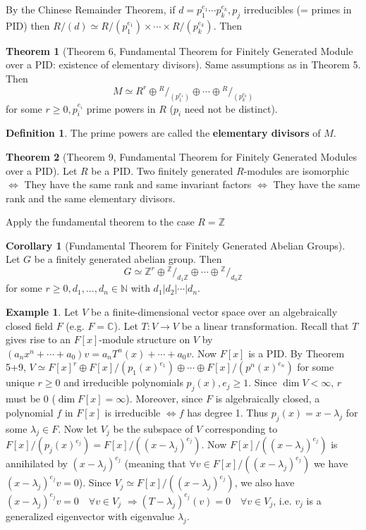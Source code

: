 \documentclass{article}
\theoremstyle{definition}
\newtheorem{thm}{Theorem}
\newtheorem{ex}{Example}
\newtheorem{dfn}{Definition}
\newtheorem{cor}{Corollary}
\newcommand*\quot[2]{{^{\textstyle #1}\big/_{\textstyle #2}}}
\newcommand{\CC}{\mathbb C}
\newcommand{\NN}{\mathbb N}
\newcommand{\ZZ}{\mathbb Z}
\newcommand{\Ra}{\Rightarrow}
\newcommand{\Lra}{\Leftrightarrow}
\begin{document}
\par By the Chinese Remainder Theorem, if $d = p_1^{e_1} \cdots p_k^{e_k}, p_j$ irreducibles (= primes in PID) then $R/(d) \simeq R/(p_1^{e_1}) \times \cdots \times R/(p_k^{e_k})$.
Then

\begin{thm}[Theorem 6, Fundamental Theorem for Finitely Generated Module over a PID: existence of elementary divisors]
	Same assumptions as in Theorem 5.
	Then
	\[
		M \simeq R^r \oplus \quot{R}{(p_1^{e_1})} \oplus \cdots \oplus \quot{R}{(p_k^{e_k})}
	\]
	for some $r \geq 0, p_i^{e_i}$ prime powers in $R$ ($p_i$ need not be distinct).
\end{thm}

\begin{dfn}
	The prime powers are called the \textbf{elementary divisors} of $M$.
\end{dfn}

\begin{thm}[Theorem 9, Fundamental Theorem for Finitely Generated Modules over a PID]
	Let $R$ be a PID.
	Two finitely generated $R$-modules are isomorphic
	$\Lra$ They have the same rank and same invariant factors
	$\Lra$ They have the same rank and the same elementary divisors.
\end{thm}

Apply the fundamental theorem to the case $R = \ZZ$

\begin{cor}[Fundamental Theorem for Finitely Generated Abelian Groups]
	Let $G$ be a finitely generated abelian group.
	Then
	\[
		G \simeq \ZZ^r \oplus \quot{\ZZ}{d_1 \ZZ} \oplus \cdots \oplus \quot{\ZZ}{d_n \ZZ}
	\]
	for some $r \geq 0, d_1, ..., d_n \in \NN$ with $d_1 | d_2 | \cdots | d_n$.
\end{cor}

\begin{ex}
	Let $V$ be a finite-dimensional vector space over an algebraically closed field $F$ (e.g. $F = \CC$).
	Let $T: V \to V$ be a linear transformation.
	Recall that $T$ gives rise to an $F[x]$-module structure on $V$ by  $(a_n x^n + \cdots + a_0) v = a_n T^n(x) + \cdots + a_0 v$.
	Now $F[x]$ is a PID.
	By Theorem 5+9, $V \simeq F[x]^r \oplus F[x]/(p_1(x)^{e_1}) \oplus \cdots \oplus F[x]/(p^n(x)^{e_n})$ for some unique $r \geq 0$ and irreducible polynomials $p_j(x), e_j \geq 1$.
	Since $\dim V < \infty$, $r$ must be $0$ ($\dim F[x] = \infty$).
	Moreover, since $F$ is algebraically closed, a polynomial $f$ in $F[x]$ is irreducible $\Lra f$ has degree 1.
	Thus $p_j(x) = x - \lambda_j$ for some $\lambda_j \in F$.
	Now let $V_j$ be the subspace of $V$ corresponding to $F[x]/(p_j(x)^{e_j}) = F[x]/((x - \lambda_j)^{e_j})$.
	Now $F[x]/((x - \lambda_j)^{e_j})$ is annihilated by $(x - \lambda_j)^{e_j}$ (meaning that $\forall v \in F[x]/((x - \lambda_j)^{e_j})$ we have $(x - \lambda_j)^{e_j} v = 0$).
	Since $V_j \simeq F[x]/((x - \lambda_j)^{e_j})$, we also have $(x - \lambda_j)^{e_j} v = 0 \quad \forall v \in V_j$
	$\Ra (T - \lambda_j)^{e_j} (v) = 0 \quad \forall v \in V_j$, i.e. $v_j$ is a generalized eigenvector with eigenvalue $\lambda_j$.
\end{ex}
\end{document}

